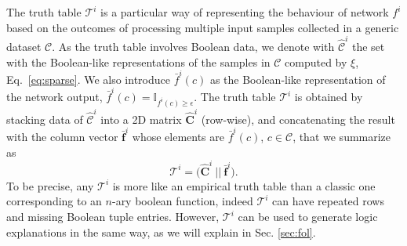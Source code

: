 The truth table $\mathcal{T}^i$ is a particular way of representing the behaviour of network $f^i$ based on the outcomes of
 processing multiple input samples collected in a generic dataset $\mathcal{C}$.
 As the truth table involves Boolean data, we denote with 
$\hat{\mathcal{C}}^i$ the set with the Boolean-like representations of the samples in $\mathcal{C}$ computed by $\xi$, Eq.~\ref{eq:sparse}.
We also introduce $\bar{f}^i(c)$ as the Boolean-like representation of the network output, $\bar{f}^i(c)=\mathbb{I}_{f^i(c)\geq \epsilon}$.
The truth table $\mathcal{T}^i$ is obtained by stacking data of $\hat{\mathcal{C}}^i$ into a 2D matrix $\hat{\mathbf{C}}^i$ (row-wise), and concatenating the result with the column vector $\bar{\mathbf{f}}^i$ whose elements are $\bar{f}^i(c)$, $c\in \mathcal{C}$, that we summarize as
\begin{equation} \label{eq:truth-table}
    \mathcal{T}^i = \Big( \hat{\mathbf{C}}^i \ \Big|\Big| \ \bar{\mathbf{f}}^i \Big).
\end{equation}
To be precise, any $\mathcal{T}^i$ is more like an empirical truth table than a classic one corresponding to an $n$-ary boolean function, indeed $\mathcal{T}^i$ can have repeated rows and missing Boolean tuple entries. However, $\mathcal{T}^i$ can be used to generate logic explanations in the same way, as we will explain in Sec. \ref{sec:fol}.
